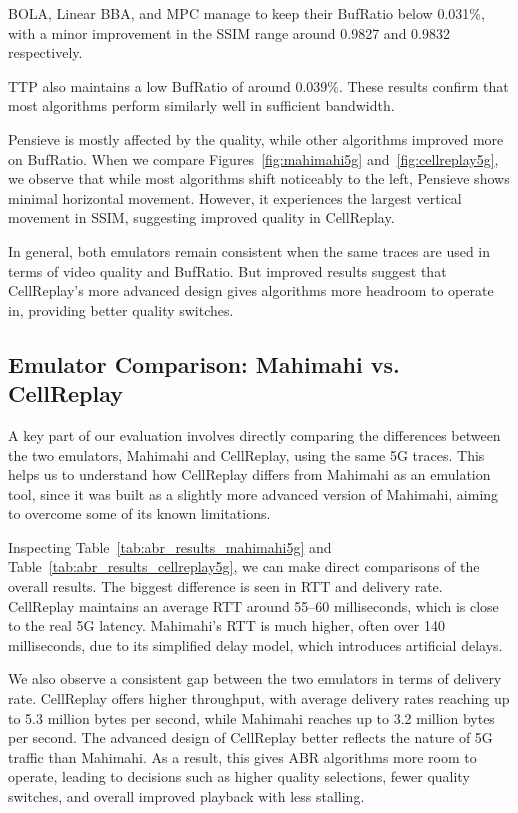 BOLA, Linear BBA, and MPC manage to keep their BufRatio below 0.031\%, with a minor improvement in the SSIM range around 0.9827 and 0.9832 respectively.

TTP also maintains a low BufRatio of around 0.039\%. These results confirm that most algorithms perform similarly well in sufficient bandwidth.

Pensieve is mostly affected by the quality, while other algorithms improved more on BufRatio. When we compare Figures~\ref{fig:mahimahi5g} and~\ref{fig:cellreplay5g}, we observe that while most algorithms shift noticeably to the left, Pensieve shows minimal horizontal movement. However, it experiences the largest vertical movement in SSIM, suggesting improved quality in CellReplay.

In general, both emulators remain consistent when the same traces are used in terms of video quality and BufRatio. But improved results suggest that CellReplay's more advanced design gives algorithms more headroom to operate in, providing better quality switches.

\vspace{30pt}

\subsection{Emulator Comparison: Mahimahi vs. CellReplay}

A key part of our evaluation involves directly comparing the differences between the two emulators, Mahimahi and CellReplay, using the same 5G traces. This helps us to understand how CellReplay differs from Mahimahi as an emulation tool, since it was built as a slightly more advanced version of Mahimahi, aiming to overcome some of its known limitations.

Inspecting Table~\ref{tab:abr_results_mahimahi5g} and Table~\ref{tab:abr_results_cellreplay5g}, we can make direct comparisons of the overall results. The biggest difference is seen in RTT and delivery rate. CellReplay maintains an average RTT around 55–60 milliseconds, which is close to the real 5G latency. Mahimahi's RTT is much higher, often over 140 milliseconds, due to its simplified delay model, which introduces artificial delays.

We also observe a consistent gap between the two emulators in terms of delivery rate. CellReplay offers higher throughput, with average delivery rates reaching up to 5.3 million bytes per second, while Mahimahi reaches up to 3.2 million bytes per second. The advanced design of CellReplay better reflects the nature of 5G traffic than Mahimahi. As a result, this gives ABR algorithms more room to operate, leading to decisions such as higher quality selections, fewer quality switches, and overall improved playback with less stalling.

